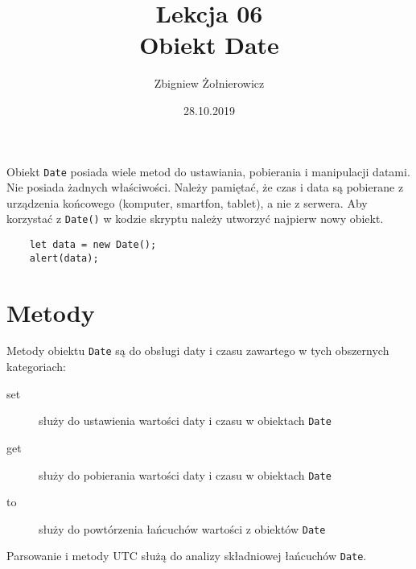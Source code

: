 \documentclass[a4paper]{article}
\begin{document}
\title{{\huge Lekcja 06} \\
    {\Large Obiekt Date}}
\author{Zbigniew Żołnierowicz}
\date{28.10.2019}
\maketitle
Obiekt \texttt{Date} posiada wiele metod do ustawiania, pobierania i manipulacji datami.
Nie posiada żadnych właściwości. Należy pamiętać, że czas i data są pobierane z urządzenia końcowego (komputer, smartfon, tablet), a nie z serwera.
Aby korzystać z \texttt{Date()} w kodzie skryptu należy utworzyć najpierw nowy obiekt.
\begin{verbatim}
    let data = new Date();
    alert(data);
\end{verbatim}
\section{Metody}
Metody obiektu \texttt{Date} są do obsługi daty i czasu zawartego w tych obszernych kategoriach:
\begin{description}
    \item[set] służy do ustawienia wartości daty i czasu w obiektach \texttt{Date}
    \item[get] służy do pobierania wartości daty i czasu w obiektach \texttt{Date}
    \item[to] służy do powtórzenia łańcuchów wartości z obiektów \texttt{Date}
\end{description}
Parsowanie i metody UTC służą do analizy składniowej łańcuchów \texttt{Date}.
\end{document}
